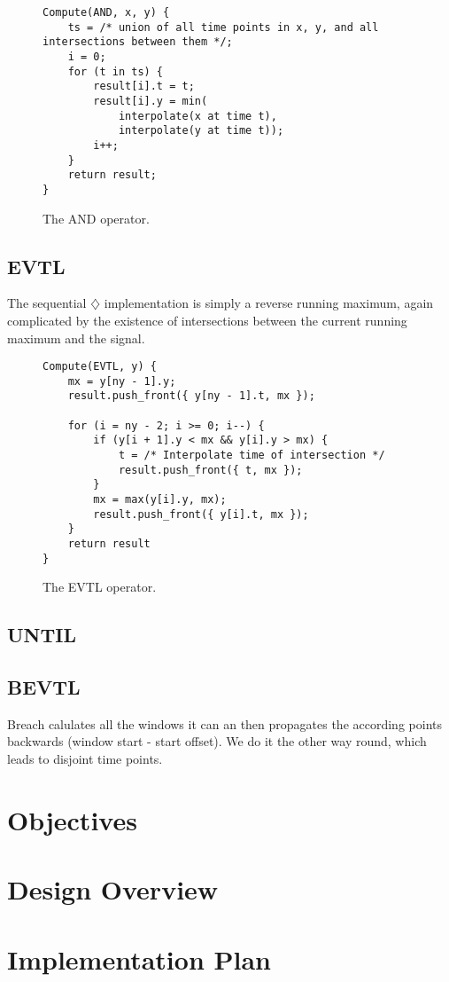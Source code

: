 \documentclass[a4paper,10pt]{article}
\newcommand{\Evtl}{\diamondsuit}
\begin{document}
\begin{figure}[ht]
\begin{lstlisting}
Compute(AND, x, y) {
    ts = /* union of all time points in x, y, and all intersections between them */;
    i = 0;
    for (t in ts) {
        result[i].t = t;
        result[i].y = min(
            interpolate(x at time t),
            interpolate(y at time t));
        i++;
    }
    return result;
}
\end{lstlisting}
\label{fig:and}
\caption{The AND operator.}
\end{figure}

\subsection{EVTL}

The sequential $\Evtl$ implementation is simply a reverse running maximum, again
complicated by the existence of intersections between the current running maximum
and the signal.

\begin{figure}[ht]
\begin{lstlisting}
Compute(EVTL, y) {
    mx = y[ny - 1].y;
    result.push_front({ y[ny - 1].t, mx });

    for (i = ny - 2; i >= 0; i--) {
        if (y[i + 1].y < mx && y[i].y > mx) {
            t = /* Interpolate time of intersection */
            result.push_front({ t, mx });
        }
        mx = max(y[i].y, mx);
        result.push_front({ y[i].t, mx });
    }
    return result
}
\end{lstlisting}
\label{fig:evtl}
\caption{The EVTL operator.}
\end{figure}


\subsection{UNTIL}

\subsection{BEVTL}

Breach calulates all the windows it can an then propagates the according points
backwards (window start - start offset). We do it the other way round, which leads to
disjoint time points.

\section{Objectives}

\section{Design Overview}

\section{Implementation Plan}
\end{document}

